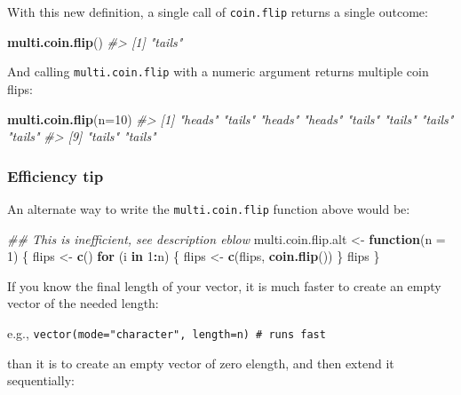 \documentclass[]{book}
\newenvironment{Shaded}{\begin{snugshade}}{\end{snugshade}}
\newcommand{\CommentTok}[1]{\textcolor[rgb]{0.56,0.35,0.01}{\textit{#1}}}
\newcommand{\ControlFlowTok}[1]{\textcolor[rgb]{0.13,0.29,0.53}{\textbf{#1}}}
\newcommand{\DataTypeTok}[1]{\textcolor[rgb]{0.13,0.29,0.53}{#1}}
\newcommand{\DecValTok}[1]{\textcolor[rgb]{0.00,0.00,0.81}{#1}}
\newcommand{\KeywordTok}[1]{\textcolor[rgb]{0.13,0.29,0.53}{\textbf{#1}}}
\newcommand{\NormalTok}[1]{#1}
\newcommand{\OperatorTok}[1]{\textcolor[rgb]{0.81,0.36,0.00}{\textbf{#1}}}
\newcommand{\StringTok}[1]{\textcolor[rgb]{0.31,0.60,0.02}{#1}}
\theoremstyle{definition}
\theoremstyle{definition}
\theoremstyle{definition}
\theoremstyle{remark}
\begin{document}
With this new definition, a single call of \texttt{coin.flip} returns a
single outcome:

\begin{Shaded}
\begin{Highlighting}[]
\KeywordTok{multi.coin.flip}\NormalTok{()}
\CommentTok{#> [1] "tails"}
\end{Highlighting}
\end{Shaded}

And calling \texttt{multi.coin.flip} with a numeric argument returns
multiple coin flips:

\begin{Shaded}
\begin{Highlighting}[]
\KeywordTok{multi.coin.flip}\NormalTok{(}\DataTypeTok{n=}\DecValTok{10}\NormalTok{)}
\CommentTok{#>  [1] "heads" "tails" "heads" "heads" "tails" "tails" "tails" "tails"}
\CommentTok{#>  [9] "tails" "tails"}
\end{Highlighting}
\end{Shaded}

\hypertarget{efficiency-tip}{%
\subsubsection{Efficiency tip}\label{efficiency-tip}}

An alternate way to write the \texttt{multi.coin.flip} function above
would be:

\begin{Shaded}
\begin{Highlighting}[]
\CommentTok{## This is inefficient, see description eblow}
\NormalTok{multi.coin.flip.alt <-}\StringTok{ }\ControlFlowTok{function}\NormalTok{(}\DataTypeTok{n =} \DecValTok{1}\NormalTok{) \{}
\NormalTok{  flips <-}\StringTok{ }\KeywordTok{c}\NormalTok{()}
  \ControlFlowTok{for}\NormalTok{ (i }\ControlFlowTok{in} \DecValTok{1}\OperatorTok{:}\NormalTok{n) \{}
\NormalTok{    flips <-}\StringTok{ }\KeywordTok{c}\NormalTok{(flips, }\KeywordTok{coin.flip}\NormalTok{())}
\NormalTok{  \}}
\NormalTok{  flips}
\NormalTok{\}}
\end{Highlighting}
\end{Shaded}

If you know the final length of your vector, it is much faster to create
an empty vector of the needed length:

e.g., \texttt{vector(mode="character",\ length=n)\ \#\ runs\ fast}

than it is to create an empty vector of zero elength, and then extend it
sequentially:
\end{document}
